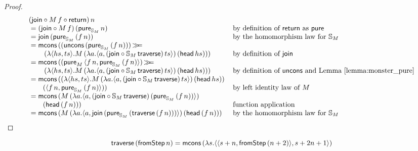 \begin{proof}
$$
\begin{array}{ll}
(\join \comp  M\, f \comp \return)\, n \\
{}= (\join \comp  M\, f)\, (\apure_{\stream{M}}\, n)
  & \mbox{by definition of } \return \mbox{ as } \apure \\
{}= \join\, (\apure_{\stream{M}}\, (f \,n))
  & \mbox{by the homomorphism law for } \stream{M}\\
{}= \mcons\, ((\uncons\, (\apure_{\stream{M}}\, (f\, n)))\, \bind \\\qquad \,(\lambda \pair{hs}{ts} . M\,(\lambda a . \pair{a}{(\join \comp \stream{M}\,\mathsf{traverse})\, ts})\, (\head\, hs)))
  & \mbox{by definition of } \join \\
{}= \mcons\,((\apure_{M}\,\pair{f\, n}{\apure_{\stream{M}}\,(f\, n)})\, \bind \\\qquad \,(\lambda \pair{hs}{ts} . M\,(\lambda a . \pair{a}{(\join \comp \stream{M}\, \mathsf{traverse})\, ts})\, (\head\, hs)))
  & \mbox{by definition of } \uncons \mbox{ and Lemma \ref{lemma:monster_pure}}\\
{}= \mcons\, ((\lambda \pair{hs}{ts} . M\,(\lambda a . \pair{a}{(\join \comp \stream{M}\,\mathsf{traverse})\, ts})\, (\head\, hs)) \, \\\qquad (\pair{f\, n}{\apure_{\stream{M}}\,(f\, n)}))
  & \mbox{by left identity law of } M \\
{}= \mcons\,(M\,(\lambda a . \pair{a}{(\join \comp \stream{M}\,\mathsf{traverse})\, (\apure_{\stream{M}}\,(f\, n))})\, \\ \qquad (\head\, (f\, n)))
 & \mbox{function application} \\
 {}= \mcons\, (M\,(\lambda a . \pair{a}{\join\, (\apure_{\stream{M}}\, (\mathsf{traverse}\, (f\, n)))})\, (\head\, (f\, n)))
 & \mbox{by the homomorphism law for } \stream{M}\\

\end{array} 
$$
\end{proof}


\begin{lemma}\label{lemma:traverse_fromstepstr}
$$
\mathsf{traverse}\, (\mathsf{fromStep}\, n) = \mathsf{mcons}\, (\lambda s . \langle \langle s+n, \mathsf{fromStep}\, (n + 2) \rangle, s + 2n + 1 \rangle)
$$
\end{lemma} 

